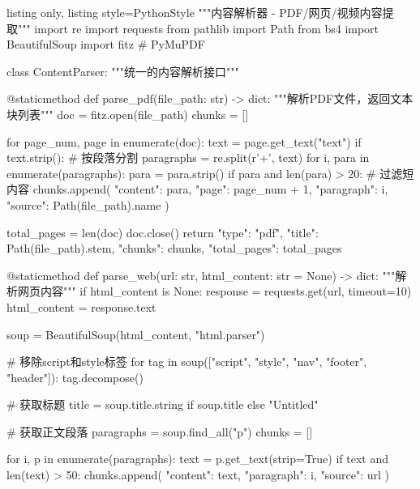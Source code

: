 \documentclass[12pt,a4paper,oneside]{article}
\begin{document}
\begin{tcblisting}{listing only, listing style=PythonStyle}
"""内容解析器 - PDF/网页/视频内容提取"""
import re
import requests
from pathlib import Path
from bs4 import BeautifulSoup
import fitz  # PyMuPDF

class ContentParser:
    """统一的内容解析接口"""

    @staticmethod
    def parse_pdf(file_path: str) -> dict:
        """解析PDF文件，返回文本块列表"""
        doc = fitz.open(file_path)
        chunks = []

        for page_num, page in enumerate(doc):
            text = page.get_text("text")
            if text.strip():
                # 按段落分割
                paragraphs = re.split(r'\n\n+', text)
                for i, para in enumerate(paragraphs):
                    para = para.strip()
                    if para and len(para) > 20:  # 过滤短内容
                        chunks.append({
                            "content": para,
                            "page": page_num + 1,
                            "paragraph": i,
                            "source": Path(file_path).name
                        })

        total_pages = len(doc)
        doc.close()
        return {
            "type": "pdf",
            "title": Path(file_path).stem,
            "chunks": chunks,
            "total_pages": total_pages
        }

    @staticmethod
    def parse_web(url: str, html_content: str = None) -> dict:
        """解析网页内容"""
        if html_content is None:
            response = requests.get(url, timeout=10)
            html_content = response.text

        soup = BeautifulSoup(html_content, "html.parser")

        # 移除script和style标签
        for tag in soup(["script", "style", "nav", "footer", "header"]):
            tag.decompose()

        # 获取标题
        title = soup.title.string if soup.title else "Untitled"

        # 获取正文段落
        paragraphs = soup.find_all("p")
        chunks = []

        for i, p in enumerate(paragraphs):
            text = p.get_text(strip=True)
            if text and len(text) > 50:
                chunks.append({
                    "content": text,
                    "paragraph": i,
                    "source": url
                })


\end{tcblisting}
\end{document}
